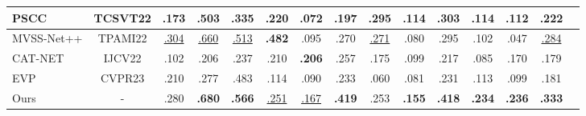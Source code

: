 \documentclass[10pt,journal,compsoc]{IEEEtran}
\begin{document}
\begin{table*}
{\begin{tabular}{lcccccccccccccc}
    PSCC \cite{liu2022pscc} & TCSVT22 & .173 & .503 & .335 & .220 & .072 & .197 & \textbf{.295} & .114 & .303 & .114 & .112 & .222 \\
    \midrule
    MVSS-Net++ \cite{dong2022mvss} & TPAMI22 & \underline{.304} & \underline{.660} & \underline{.513} & \textbf{.482} & .095 & .270 & \underline{.271} & .080 & .295 & .102 & .047 & \underline{.284} \\	
    \midrule		
    CAT-NET \cite{kwon2022learning} & IJCV22 & .102 & .206 & .237 & .210 & \textbf{.206} & .257 & .175 & .099 & .217 & .085 & .170 & .179\\
    \midrule
    EVP \cite{liu2023evp} & CVPR23 & .210 & .277 & .483 & .114 & .090 & .233 & .060 & .081 & .231 & .113 & .099 & .181 \\
    \midrule[1.5pt]
    Ours & - & .280 & \textbf{.680} & \textbf{.566} & \underline{.251} & \underline{.167} & \textbf{.419} & .253 & \textbf{.155} & \textbf{.418} & \textbf{.234} & \textbf{.236} & \textbf{.333}\\
    \bottomrule
  \end{tabular}}
  \label{f1_table}
\end{table*}
\end{document}
